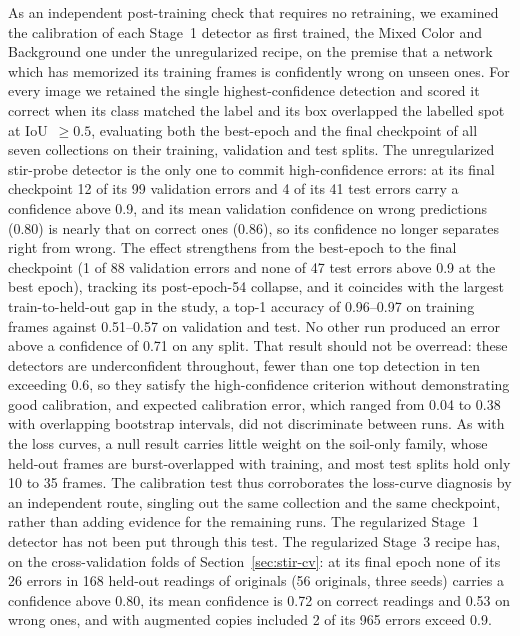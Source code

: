 ﻿\documentclass[journal]{IEEEtran}
\begin{document}
As an independent post-training check that requires no retraining, we examined the calibration of each Stage~1 detector as first trained, the Mixed Color and Background one under the unregularized recipe, on the premise that a network which has memorized its training frames is confidently wrong on unseen ones. For every image we retained the single highest-confidence detection and scored it correct when its class matched the label and its box overlapped the labelled spot at IoU~$\geq 0.5$, evaluating both the best-epoch and the final checkpoint of all seven collections on their training, validation and test splits. The unregularized stir-probe detector is the only one to commit high-confidence errors: at its final checkpoint 12 of its 99 validation errors and 4 of its 41 test errors carry a confidence above 0.9, and its mean validation confidence on wrong predictions (0.80) is nearly that on correct ones (0.86), so its confidence no longer separates right from wrong. The effect strengthens from the best-epoch to the final checkpoint (1 of 88 validation errors and none of 47 test errors above 0.9 at the best epoch), tracking its post-epoch-54 collapse, and it coincides with the largest train-to-held-out gap in the study, a top-1 accuracy of 0.96--0.97 on training frames against 0.51--0.57 on validation and test. No other run produced an error above a confidence of 0.71 on any split. That result should not be overread: these detectors are underconfident throughout, fewer than one top detection in ten exceeding 0.6, so they satisfy the high-confidence criterion without demonstrating good calibration, and expected calibration error, which ranged from 0.04 to 0.38 with overlapping bootstrap intervals, did not discriminate between runs. As with the loss curves, a null result carries little weight on the soil-only family, whose held-out frames are burst-overlapped with training, and most test splits hold only 10 to 35 frames. The calibration test thus corroborates the loss-curve diagnosis by an independent route, singling out the same collection and the same checkpoint, rather than adding evidence for the remaining runs. The regularized Stage~1 detector has not been put through this test. The regularized Stage~3 recipe has, on the cross-validation folds of Section~\ref{sec:stir-cv}: at its final epoch none of its 26 errors in 168 held-out readings of originals (56 originals, three seeds) carries a confidence above 0.80, its mean confidence is 0.72 on correct readings and 0.53 on wrong ones, and with augmented copies included 2 of its 965 errors exceed 0.9.
\end{document}
